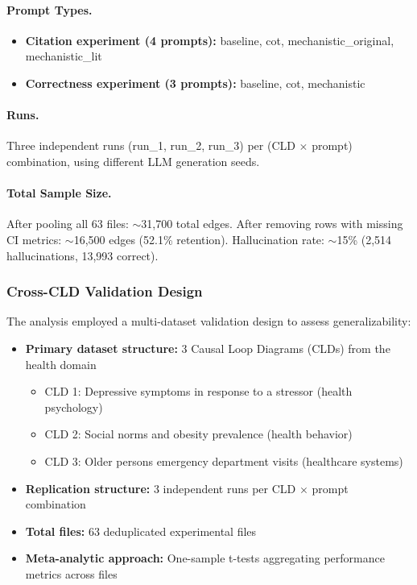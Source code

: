 \paragraph{Prompt Types.}
\begin{itemize}
    \item \textbf{Citation experiment (4 prompts):} baseline, cot, mechanistic\_original, mechanistic\_lit
    \item \textbf{Correctness experiment (3 prompts):} baseline, cot, mechanistic
\end{itemize}

\paragraph{Runs.} Three independent runs (run\_1, run\_2, run\_3) per (CLD $\times$ prompt) combination, using different LLM generation seeds.

\paragraph{Total Sample Size.} After pooling all 63 files: $\sim$31,700 total edges. After removing rows with missing CI metrics: $\sim$16,500 edges (52.1\% retention). Hallucination rate: $\sim$15\% (2,514 hallucinations, 13,993 correct).

\subsubsection{Cross-CLD Validation Design}

The analysis employed a multi-dataset validation design to assess generalizability:

\begin{itemize}
    \item \textbf{Primary dataset structure:} 3 Causal Loop Diagrams (CLDs) from the health domain
    \begin{itemize}
        \item CLD 1: Depressive symptoms in response to a stressor (health psychology)
        \item CLD 2: Social norms and obesity prevalence (health behavior)
        \item CLD 3: Older persons emergency department visits (healthcare systems)
    \end{itemize}
    \item \textbf{Replication structure:} 3 independent runs per CLD $\times$ prompt combination
    \item \textbf{Total files:} 63 deduplicated experimental files
    \item \textbf{Meta-analytic approach:} One-sample t-tests aggregating performance metrics across files
\end{itemize}

